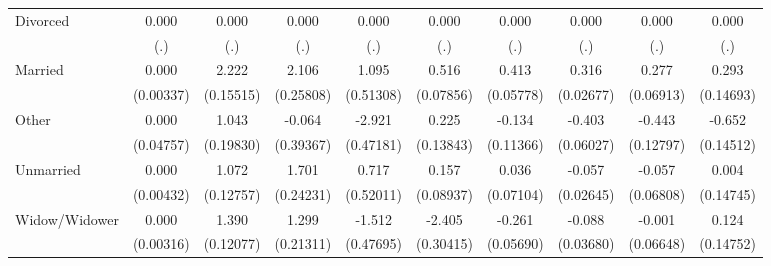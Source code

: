 {\begin{tabular}{l*{9}{c}}
Divorced            &       0.000         &       0.000         &       0.000         &       0.000         &       0.000         &       0.000         &       0.000         &       0.000         &       0.000         \\
                    &         (.)         &         (.)         &         (.)         &         (.)         &         (.)         &         (.)         &         (.)         &         (.)         &         (.)         \\
Married             &       0.000         &       2.222\sym{***}&       2.106\sym{***}&       1.095\sym{*}  &       0.516\sym{***}&       0.413\sym{***}&       0.316\sym{***}&       0.277\sym{***}&       0.293\sym{*}  \\
                    &   (0.00337)         &   (0.15515)         &   (0.25808)         &   (0.51308)         &   (0.07856)         &   (0.05778)         &   (0.02677)         &   (0.06913)         &   (0.14693)         \\
Other               &       0.000         &       1.043\sym{***}&      -0.064         &      -2.921\sym{***}&       0.225         &      -0.134         &      -0.403\sym{***}&      -0.443\sym{***}&      -0.652\sym{***}\\
                    &   (0.04757)         &   (0.19830)         &   (0.39367)         &   (0.47181)         &   (0.13843)         &   (0.11366)         &   (0.06027)         &   (0.12797)         &   (0.14512)         \\
Unmarried           &       0.000         &       1.072\sym{***}&       1.701\sym{***}&       0.717         &       0.157         &       0.036         &      -0.057\sym{*}  &      -0.057         &       0.004         \\
                    &   (0.00432)         &   (0.12757)         &   (0.24231)         &   (0.52011)         &   (0.08937)         &   (0.07104)         &   (0.02645)         &   (0.06808)         &   (0.14745)         \\
Widow/Widower       &       0.000         &       1.390\sym{***}&       1.299\sym{***}&      -1.512\sym{**} &      -2.405\sym{***}&      -0.261\sym{***}&      -0.088\sym{*}  &      -0.001         &       0.124         \\
                    &   (0.00316)         &   (0.12077)         &   (0.21311)         &   (0.47695)         &   (0.30415)         &   (0.05690)         &   (0.03680)         &   (0.06648)         &   (0.14752)         \\

\end{tabular}}
